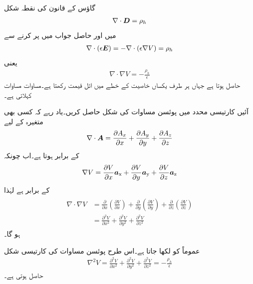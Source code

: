 گاؤس کے قانون کی نقطہ شکل
\begin{align}
\nabla \cdot {\ensuremath{{\boldsymbol{D}}}}=\rho_h
\end{align}
میں  اور حاصل جواب میں  پر کرنے سے
\begin{align*}
\nabla \cdot (\epsilon {\ensuremath{{\boldsymbol{E}}}})=-\nabla \cdot (\epsilon \nabla V)=\rho_h 
\end{align*}
یعنی
\begin{align}\label{مساوات_پوئسن_نقطہ}
\nabla \cdot \nabla V=-\frac{\rho_h}{\epsilon}
\end{align}
حاصل ہوتا ہے  جہاں ہر طرف یکساں خاصیت کے خطے میں  اٹل قیمت رکھتا ہے۔مساوات   مساوات  کہلاتی ہے۔

آئیں کارتیسی محدد میں پوئسن مساوات کی شکل حاصل کریں۔یاد رہے کہ کسی بھی متغیرہ  کے لیے
\begin{align*}
\nabla \cdot {\ensuremath{{\boldsymbol{A}}}}=\frac{\partial A_x}{\partial x}+\frac{\partial A_y}{\partial y}+\frac{\partial A_z}{\partial z}
\end{align*}  
کے برابر ہوتا ہے۔اب چونکہ
\begin{align*}
\nabla{V}=\frac{\partial V}{\partial x}{\boldsymbol{a}}_{\textup{x}}+\frac{\partial V}{\partial y}{\boldsymbol{a}}_{\textup{y}}+\frac{\partial V}{\partial z}{\boldsymbol{a}}_{\textup{z}}
\end{align*}
 کے برابر ہے لہٰذا
\begin{gather}
\begin{aligned}
\nabla \cdot \nabla V&=\frac{\partial }{\partial x}\left(\frac{\partial V}{\partial x}\right)+\frac{\partial }{\partial y}\left(\frac{\partial V}{\partial y}\right)+\frac{\partial }{\partial z}\left(\frac{\partial V}{\partial z}\right)\\
&=\frac{\partial^2 V}{\partial x^2}+\frac{\partial^2 V}{\partial y^2}+\frac{\partial^2 V}{\partial z^2}
\end{aligned}
\end{gather}
 ہو گا۔

عموماً  کو  لکھا جاتا ہے۔اس طرح پوئسن مساوات کی کارتیسی شکل
\begin{align}\label{مساوات_لاپلاس_پوئسن_کارتیسی_شکل}
\nabla^2 V=\frac{\partial^2 V}{\partial x^2}+\frac{\partial^2 V}{\partial y^2}+\frac{\partial^2 V}{\partial z^2}=-\frac{\rho_h}{\epsilon}
\end{align}
حاصل ہوتی ہے۔ 

